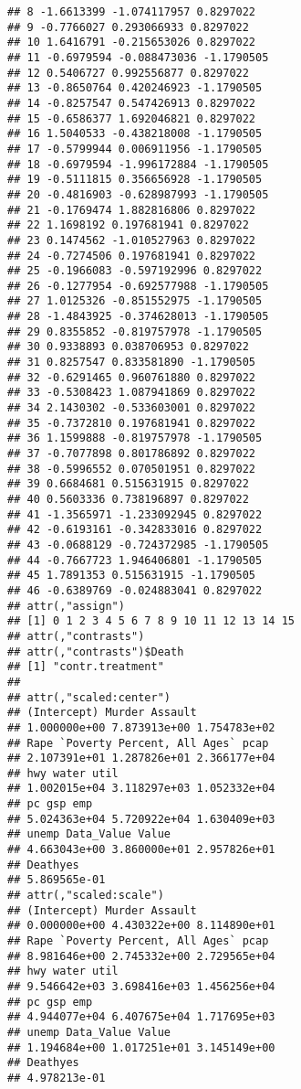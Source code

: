 \documentclass[]{article}
\newenvironment{Shaded}{\begin{snugshade}}{\end{snugshade}}
\newcommand{\DataTypeTok}[1]{\textcolor[rgb]{0.13,0.29,0.53}{#1}}
\newcommand{\FloatTok}[1]{\textcolor[rgb]{0.00,0.00,0.81}{#1}}
\newcommand{\KeywordTok}[1]{\textcolor[rgb]{0.13,0.29,0.53}{\textbf{#1}}}
\newcommand{\NormalTok}[1]{#1}
\newcommand{\OperatorTok}[1]{\textcolor[rgb]{0.81,0.36,0.00}{\textbf{#1}}}
\newcommand{\StringTok}[1]{\textcolor[rgb]{0.31,0.60,0.02}{#1}}
\begin{document}
\begin{verbatim}
## 8 -1.6613399 -1.074117957 0.8297022
## 9 -0.7766027 0.293066933 0.8297022
## 10 1.6416791 -0.215653026 0.8297022
## 11 -0.6979594 -0.088473036 -1.1790505
## 12 0.5406727 0.992556877 0.8297022
## 13 -0.8650764 0.420246923 -1.1790505
## 14 -0.8257547 0.547426913 0.8297022
## 15 -0.6586377 1.692046821 0.8297022
## 16 1.5040533 -0.438218008 -1.1790505
## 17 -0.5799944 0.006911956 -1.1790505
## 18 -0.6979594 -1.996172884 -1.1790505
## 19 -0.5111815 0.356656928 -1.1790505
## 20 -0.4816903 -0.628987993 -1.1790505
## 21 -0.1769474 1.882816806 0.8297022
## 22 1.1698192 0.197681941 0.8297022
## 23 0.1474562 -1.010527963 0.8297022
## 24 -0.7274506 0.197681941 0.8297022
## 25 -0.1966083 -0.597192996 0.8297022
## 26 -0.1277954 -0.692577988 -1.1790505
## 27 1.0125326 -0.851552975 -1.1790505
## 28 -1.4843925 -0.374628013 -1.1790505
## 29 0.8355852 -0.819757978 -1.1790505
## 30 0.9338893 0.038706953 0.8297022
## 31 0.8257547 0.833581890 -1.1790505
## 32 -0.6291465 0.960761880 0.8297022
## 33 -0.5308423 1.087941869 0.8297022
## 34 2.1430302 -0.533603001 0.8297022
## 35 -0.7372810 0.197681941 0.8297022
## 36 1.1599888 -0.819757978 -1.1790505
## 37 -0.7077898 0.801786892 0.8297022
## 38 -0.5996552 0.070501951 0.8297022
## 39 0.6684681 0.515631915 0.8297022
## 40 0.5603336 0.738196897 0.8297022
## 41 -1.3565971 -1.233092945 0.8297022
## 42 -0.6193161 -0.342833016 0.8297022
## 43 -0.0688129 -0.724372985 -1.1790505
## 44 -0.7667723 1.946406801 -1.1790505
## 45 1.7891353 0.515631915 -1.1790505
## 46 -0.6389769 -0.024883041 0.8297022
## attr(,"assign")
## [1] 0 1 2 3 4 5 6 7 8 9 10 11 12 13 14 15
## attr(,"contrasts")
## attr(,"contrasts")$Death
## [1] "contr.treatment"
##
## attr(,"scaled:center")
## (Intercept) Murder Assault
## 1.000000e+00 7.873913e+00 1.754783e+02
## Rape `Poverty Percent, All Ages` pcap
## 2.107391e+01 1.287826e+01 2.366177e+04
## hwy water util
## 1.002015e+04 3.118297e+03 1.052332e+04
## pc gsp emp
## 5.024363e+04 5.720922e+04 1.630409e+03
## unemp Data_Value Value
## 4.663043e+00 3.860000e+01 2.957826e+01
## Deathyes
## 5.869565e-01
## attr(,"scaled:scale")
## (Intercept) Murder Assault
## 0.000000e+00 4.430322e+00 8.114890e+01
## Rape `Poverty Percent, All Ages` pcap
## 8.981646e+00 2.745332e+00 2.729565e+04
## hwy water util
## 9.546642e+03 3.698416e+03 1.456256e+04
## pc gsp emp
## 4.944077e+04 6.407675e+04 1.717695e+03
## unemp Data_Value Value
## 1.194684e+00 1.017251e+01 3.145149e+00
## Deathyes
## 4.978213e-01
\end{verbatim}

\begin{Shaded}
\end{Shaded}
\end{document}

